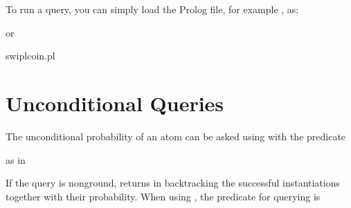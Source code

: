 \documentclass[letterpaper,10pt,english]{sphinxmanual}
\begin{document}
\sphinxAtStartPar
To run a query, you can simply load the Prolog file, for example , as:

\begin{sphinxVerbatim}[commandchars=\\\{\}]
 \PYG{p}{[}\PYG{p}{]}
\end{sphinxVerbatim}

\sphinxAtStartPar
or

\begin{sphinxVerbatim}[commandchars=\\\{\}]
swiplcoin.pl
\end{sphinxVerbatim}


\section{Unconditional Queries}
\label{\detokenize{index:unconditional-queries}}
\sphinxAtStartPar
The unconditional probability of an atom can be asked using  with the predicate

\begin{sphinxVerbatim}[commandchars=\\\{\}]
  
\end{sphinxVerbatim}

\sphinxAtStartPar
as in

\begin{sphinxVerbatim}[commandchars=\\\{\}]
 
\end{sphinxVerbatim}

\sphinxAtStartPar
If the query is non\sphinxhyphen{}ground,  returns in backtracking the successful instantiations together with their probability.
When using , the predicate for querying is

\begin{sphinxVerbatim}[commandchars=\\\{\}]
  
\end{sphinxVerbatim}
\end{document}
